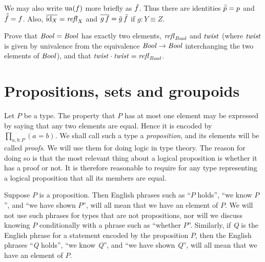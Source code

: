 We may also write $\mathrm{ua} (f)$ more briefly as $\bar {f}$.  Thus there are identities $\bar {\tilde {p}} = p$ and $\tilde {\bar {f}} = f$. Also, $\overline{\mathord{\mathrm{id}}_X}=\mathop{{\it refl}_{X}}$
and $\overline{g\,f}=\bar {g}\,\bar {f}$ if $g: Y\equiv Z$.

\begin{xca}\label{xca:C2}
Prove that $\mathop{\mathit{Bool}}=\mathop{\mathit{Bool}}$ has exactly two elements, 
$\mathop{{\it refl}_{\mathop{\mathit{Bool}}}}$ and $\mathit{twist}$ (where $\mathit{twist}$ is given by 
univalence from the equivalence $\mathop{\mathit{Bool}}\to\mathop{\mathit{Bool}}$ interchanging 
the two elements of $\mathop{\mathit{Bool}}$), and that $\mathit{twist}\cdot\mathit{twist}=\mathop{{\it refl}_{\mathop{\mathit{Bool}}}}$.
\end{xca}


\section{Propositions, sets and groupoids}
\label{sec:props-sets-grpds}

Let $P$ be a type.  The property that $P$ has at most one element may 
be expressed by saying that any two elements are equal. 
Hence it is encoded by $\prod_{a,b:P} (a=b)$.  
We shall call such a type a \emph{proposition}, 
and its elements will be called \emph{proofs}.
We will use them for doing logic in type theory.
The reason for doing so is that the most relevant
thing about a logical proposition is whether it has a proof or not.
It is therefore reasonable to require for any type representing 
a logical proposition that all its members are equal.

Suppose $P$ is a proposition.  Then English phrases such as ``$P$ holds'', ``we know $P$'', and ``we have shown $P$'', will all mean that we
have an element of $P$.  We will not use such phrases for types that are not propositions, nor will we discuss knowing $P$ conditionally with a
phrase such as ``whether $P$''.  Similarly, if {\em Q} is the English phrase for a statement encoded by the proposition $P$, then the English
phrases ``{\em Q} holds'', ``we know {\em Q}'', and ``we have shown {\em Q}'', will all mean that we have an element of $P$.

